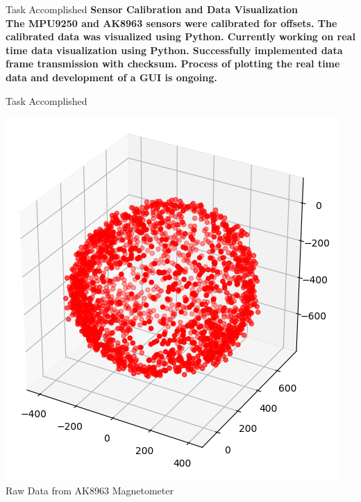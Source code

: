 \documentclass[10pt, a4paper]{beamer}
\begin{document}
\begin{frame}{Task Accomplished}
\bfseries Sensor Calibration and Data Visualization\\ \hfill \break
\mdseries The MPU9250 and AK8963 sensors were calibrated for offsets. The calibrated data was visualized using Python. Currently working on real time data visualization using Python. Successfully implemented data frame transmission with checksum. Process of plotting the real time data and development of a GUI is ongoing.
\end{frame}

\begin{frame}{Task Accomplished}
\begin{center}
\includegraphics[scale=0.45]{raw}\\
Raw Data from AK8963 Magnetometer
\end{center}
\end{frame}
\end{document}
